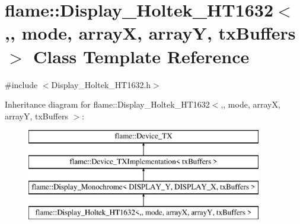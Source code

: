 \hypertarget{classflame_1_1_display___holtek___h_t1632}{\section{flame\-:\-:Display\-\_\-\-Holtek\-\_\-\-H\-T1632$<$,, mode, array\-X, array\-Y, tx\-Buffers $>$ Class Template Reference}
\label{classflame_1_1_display___holtek___h_t1632}
}


{\ttfamily \#include $<$Display\-\_\-\-Holtek\-\_\-\-H\-T1632.\-h$>$}

Inheritance diagram for flame\-:\-:Display\-\_\-\-Holtek\-\_\-\-H\-T1632$<$,, mode, array\-X, array\-Y, tx\-Buffers $>$\-:\begin{figure}[H]
\begin{center}
\leavevmode
\includegraphics[height=4.000000cm]{classflame_1_1_display___holtek___h_t1632}
\end{center}
\end{figure}
